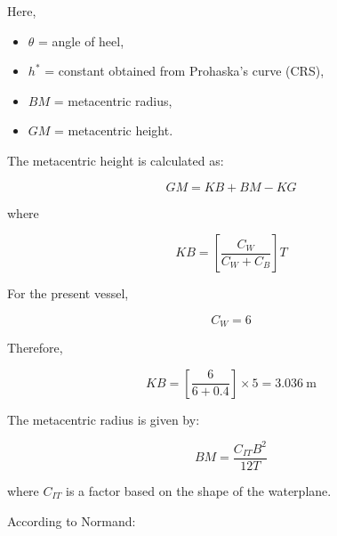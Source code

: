 \documentclass[12pt,a4paper,twoside]{report}
\begin{document}
\vspace{\baselineskip} \par \noindent Here,

\begin{itemize}
    \item $\theta$ = angle of heel,
    \item $h^*$ = constant obtained from Prohaska's curve (CRS),
    \item $BM$ = metacentric radius,
    \item $GM$ = metacentric height.
\end{itemize}

\vspace{\baselineskip} \par \noindent The metacentric height is calculated as:

\begin{equation}
GM = KB + BM - KG
\end{equation}

\vspace{\baselineskip} \par \noindent where

\begin{equation}
KB=
\left[
\frac{C_W}{C_W+C_B}
\right]T
\label{eq : 2.25}
\end{equation}

\vspace{\baselineskip} \par \noindent For the present vessel,

\[
C_W=6
\]

\vspace{\baselineskip} \par \noindent Therefore,

\[
KB=
\left[
\frac{6}{6+0.4}
\right]\times5
=3.036~\mathrm{m}
\]

\vspace{\baselineskip} \par \noindent The metacentric radius is given by:

\begin{equation}
BM=\frac{C_{IT}B^2}{12T}
\label{eq : 2.26}
\end{equation}

\vspace{\baselineskip} \par \noindent where $C_{IT}$ is a factor based on the shape of the waterplane.

\vspace{\baselineskip} \par \noindent According to Normand:
\end{document}

